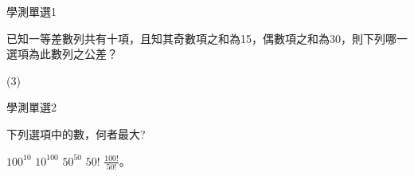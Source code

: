 \begin{QUESTIONS}
    \begin{QUESTION}
        \begin{ExamInfo}{93}{學測}{單選}{1}
        \end{ExamInfo}
        \begin{ExamAnsRateInfo}{71}{93}{79}{41}
        \end{ExamAnsRateInfo}
        \begin{QBODY}
            已知一等差數列共有十項，且知其奇數項之和為15，偶數項之和為30，則下列哪一選項為此數列之公差？ 
            \begin{QOPS} 
            \end{QOPS}
        \end{QBODY}
        \begin{QFROMS}
        \end{QFROMS}
        \begin{QTAGS}\end{QTAGS}
        \begin{QANS}
            (3)
        \end{QANS}
        \begin{QSOLLIST}
        \end{QSOLLIST}
        \begin{QEMPTYSPACE}
        \end{QEMPTYSPACE}
    \end{QUESTION}
    \begin{QUESTION}
        \begin{ExamInfo}{93}{學測}{單選}{2}
        \end{ExamInfo}
        \begin{ExamAnsRateInfo}{60}{85}{62}{33}
        \end{ExamAnsRateInfo}
        \begin{QBODY}
            下列選項中的數，何者最大? 
            \begin{QOPS} 
                \QOP $100^{10}$ 
                \QOP $10^{100}$ 
                \QOP $50^{50} $
                \QOP $50!$ 
                \QOP $\frac{100!}{50!}$。 
            \end{QOPS}
        \end{QBODY}
        \begin{QFROMS}

\end{QFROMS}
\end{QUESTION}
\end{QUESTIONS}
